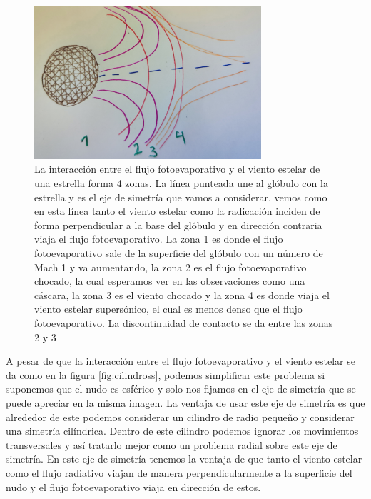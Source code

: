 \documentclass{book}
\begin{document}
\begin{figure}[h]
    \centering    \includegraphics[width=0.75\textwidth]{images Chapter 2/Chp2_Zone.jpg}
    \caption{La interacción entre el flujo fotoevaporativo y el viento estelar de una estrella forma 4 zonas. La línea punteada une al glóbulo con la estrella y es el eje de simetría que vamos a considerar, vemos como en esta línea tanto el viento estelar como la radicación inciden de forma perpendicular a la base del glóbulo y en dirección contraria viaja el flujo fotoevaporativo. La zona 1 es donde el flujo fotoevaporativo sale de la superficie del glóbulo con un número de Mach 1 y va aumentando, la zona 2 es el flujo fotoevaporativo chocado, la cual esperamos ver en las observaciones como una cáscara, la zona 3 es el viento chocado y la zona 4 es donde viaja el viento estelar supersónico, el cual es menos denso que el flujo fotoevaporativo. La discontinuidad de contacto se da entre las zonas 2 y 3}
    \label{fig:zones}
\end{figure}

A pesar de que la interacción entre el flujo fotoevaporativo y el viento estelar se da como en la figura \ref{fig:cilindross}, podemos simplificar este problema si suponemos que el nudo es esférico y solo nos fijamos en el eje de simetría que se puede apreciar en la misma imagen. La ventaja de usar este eje de simetría es que alrededor de este podemos considerar un cilindro de radio pequeño y considerar una simetría cilíndrica. Dentro de este cilindro podemos ignorar los movimientos transversales y así tratarlo mejor como un problema radial sobre este eje de simetría. En este eje de simetría tenemos la ventaja de que tanto el viento estelar como el flujo radiativo viajan de manera perpendicularmente a la superficie del nudo y el flujo fotoevaporativo viaja en dirección de estos. 
\end{document}

